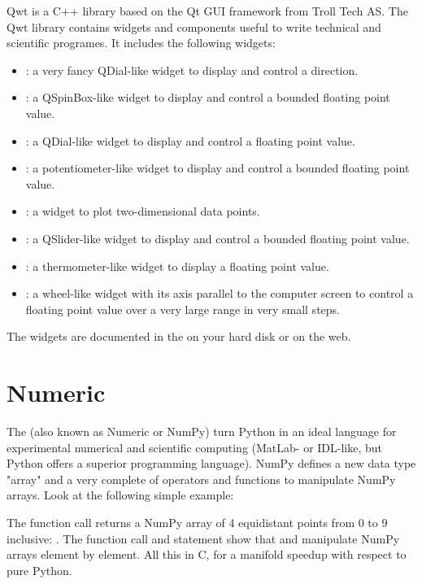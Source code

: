 \documentclass{manual}
\newcommand{\Qwt}{\ulink{Qwt}{http://qwt.sourceforge.net}}
\begin{document}
Qwt is a C++ library based on the Qt GUI framework from Troll Tech AS.
The Qwt library contains widgets and components useful to write technical
and scientific programes.
It includes the following widgets:
\begin{itemize}
  \item
    : a very fancy QDial-like widget to display and
    control a direction.
  \item
    : a QSpinBox-like widget to display and control
    a bounded floating point value.
  \item
    : a QDial-like widget to display and control a
    floating point value.
  \item
    : a potentiometer-like widget to display and control
    a bounded floating point value.
  \item
    : a widget to plot two-dimensional data points.
  \item
    : a QSlider-like widget to display and control a
    bounded floating point value.
  \item
    : a thermometer-like widget to display a floating
    point value. 
  \item
    : a wheel-like widget with its axis parallel to
    the computer screen to control a floating point value over a very
    large range in very small steps.
\end{itemize}
The widgets are documented in the
on your hard disk or \Qwt{} on the web.


\section{Numeric \label{numeric-intro}}

The 
(also known as Numeric or NumPy) turn Python in an ideal language for
experimental numerical and scientific computing (MatLab- or IDL-like,
but Python offers a superior programming language).
NumPy defines a new data type "array" and a very complete of operators and
functions to manipulate NumPy arrays.
Look at the following simple example:



The function call  returns a NumPy array of 4
equidistant points from 0 to 9 inclusive: .
The function call  and statement  show that
 and \samp{*} manipulate NumPy arrays element by element.
All this in C, for a manifold speedup with respect to pure Python.
\end{document}
